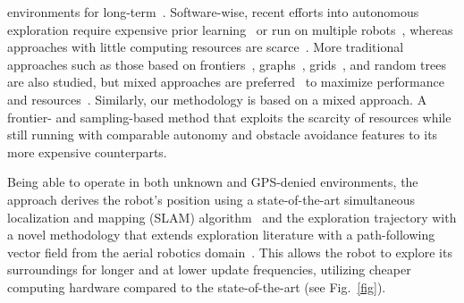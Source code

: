 \documentclass[lettersize,journal,twoside]{IEEEtran}
\theoremstyle{definition}
\begin{document}
environments for long-term~\cite{eldemiry2022autonomous,bircher2016receding}.
%
Software-wise, %
recent efforts into autonomous exploration require expensive prior learning~\cite{shrestha2019learned} or run on multiple robots~\cite{kulkarni2022autonomous,tranzatto2022cerberus,roucek2020darpa}, whereas %
approaches with little computing resources are scarce~\cite{bircher2016receding,batinovic2021multi,faisal2021low,muller2021openbot}. More traditional approaches such as those based on frontiers~\cite{kim2022autonomous,roucek2020darpa,batinovic2021multi}, graphs~\cite{kulkarni2022autonomous,tranzatto2022cerberus,dang2019graph}, grids~\cite{corah2019communication,tabib2022autonomous}, and random trees %
are also studied, but mixed approaches are %
preferred~\cite{%
shrestha2019learned,bircher2016receding,surmann2003autonomous,qiao2019sampling,
dai2020fast} to maximize performance and resources~\cite{placed2022survey,bircher2016receding}.
%
Similarly, our methodology is based on a mixed approach. A frontier- and sampling-based method that exploits the scarcity of resources while still running %
with comparable autonomy and obstacle avoidance features to its more expensive counterparts. %

Being able to operate in both unknown and GPS-denied environments, the %
approach derives the robot's 
position using a state-of-the-art simultaneous localization and mapping (SLAM) algorithm~\cite{labbe2019rtab} %
and the exploration trajectory with a novel methodology that extends exploration literature with a path-following vector field %
from the aerial robotics domain~\cite{seewald2022energy,garcia2017guidance,seewaldphdthesis}. This allows the robot to explore its surroundings for longer and at lower update frequencies, %
utilizing cheaper computing hardware compared to the state-of-the-art (see Fig.~\ref{fig}).%
\end{document}
